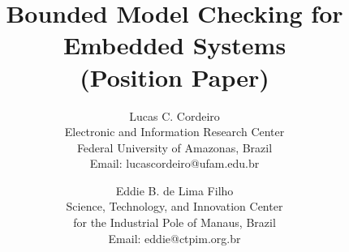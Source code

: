 \documentclass{acm_sen_article}
\begin{document}
%
\title{Bounded Model Checking for Embedded Systems \\ (Position Paper)}


\author{Lucas C. Cordeiro \\
Electronic and Information Research Center\\
Federal University of Amazonas, Brazil\\
Email: lucascordeiro@ufam.edu.br
\and
Eddie B. de Lima Filho \\
Science, Technology, and Innovation Center\\ for the Industrial Pole of Manaus, Brazil \\
Email: eddie@ctpim.org.br}


% 
\end{document}
